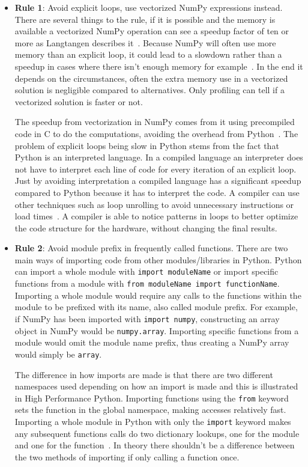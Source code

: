 \documentclass[12pt, a4paper]{article}
\begin{document}
\begin{itemize}\label{guidelines}
    \item \textbf{Rule 1}: Avoid explicit loops, use vectorized NumPy expressions instead.
    There are several things to the rule, if it is possible and the memory is available a vectorized NumPy operation can see a speedup factor of ten or more as Langtangen describes it~\cite{NumpyArray}.
    Because NumPy will often use more memory than an explicit loop, it could lead to a slowdown rather than a speedup in cases where there isn't enough memory for example~\cite{Numpy:Vectorization}.
    In the end it depends on the circumstances, often the extra memory use in a vectorized solution is negligible compared to alternatives.
    Only profiling can tell if a vectorized solution is faster or not.
    
    The speedup from vectorization in NumPy comes from it using precompiled code in C to do the computations, avoiding the overhead from Python~\cite{Numpy:Fast}.
    The problem of explicit loops being slow in Python stems from the fact that Python is an interpreted language.
    In a compiled language an interpreter does not have to interpret each line of code for every iteration of an explicit loop.
    Just by avoiding interpretation a compiled language has a significant speedup compared to Python because it has to interpret the code.
    A compiler can use other techniques such as loop unrolling to avoid unnecessary instructions or load times~\cite{wiki:LoopUnroll,agner:LoopUnroll}.
    A compiler is able to notice patterns in loops to better optimize the code structure for the hardware, without changing the final results.

    \item \textbf{Rule 2}: Avoid module prefix in frequently called functions.
    There are two main ways of importing code from other modules/libraries in Python.
    Python can import a whole module with \texttt{import moduleName} or import specific functions from a module with \texttt{from moduleName import functionName}.
    Importing a whole module would require any calls to the functions within the module to be prefixed with its name, also called module prefix.
    For example, if NumPy has been imported with \texttt{import numpy}, constructing an array object in NumPy would be \texttt{numpy.array}.
    Importing specific functions from a module would omit the module name prefix, thus creating a NumPy array would simply be \texttt{array}.
    
    The difference in how imports are made is that there are two different namespaces used depending on how an import is made and this is illustrated in High Performance Python.
    Importing functions using the \texttt{from} keyword sets the function in the global namespace, making accesses relatively fast.
    Importing a whole module in Python with only the \texttt{import} keyword makes any subsequent functions calls do two dictionary lookups, one for the module and one for the function~\cite{oreillyCh4}.
    In theory there shouldn't be a difference between the two methods of importing if only calling a function once.
    

\end{itemize}
\end{document}
